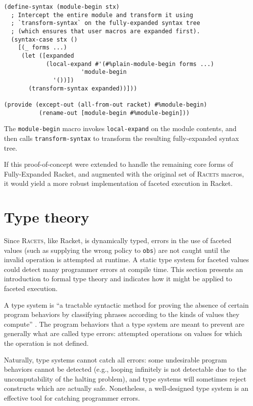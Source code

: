 \documentclass{article}
\begin{document}
\begin{lstlisting}
(define-syntax (module-begin stx)
  ; Intercept the entire module and transform it using
  ; `transform-syntax` on the fully-expanded syntax tree
  ; (which ensures that user macros are expanded first).
  (syntax-case stx ()
    [(_ forms ...)
     (let ([expanded
            (local-expand #'(#%plain-module-begin forms ...)
	                  'module-begin
			  '())])
       (transform-syntax expanded))]))

(provide (except-out (all-from-out racket) #%module-begin)
          (rename-out [module-begin #%module-begin]))
\end{lstlisting}

The \texttt{module-begin} macro invokes \texttt{local-expand} on the module contents, and then calls \texttt{transform-syntax} to transform the resulting fully-expanded syntax tree.

If this proof-of-concept were extended to handle the remaining core forms of Fully-Expanded Racket, and augmented with the original set of \textsc{Racets} macros, it would yield a more robust implementation of faceted execution in Racket.



\section{Type theory\label{sec:types}}
Since \textsc{Racets}, like Racket, is dynamically typed, errors in the use of faceted values (such as supplying the wrong policy to \texttt{obs}) are not caught until the invalid operation is attempted at runtime. A static type system for faceted values could detect many programmer errors at compile time. This section presents an introduction to formal type theory and indicates how it might be applied to faceted execution.

A type system is ``a tractable syntactic method for proving the absence of certain program behaviors by classifying phrases according to the kinds of values they compute'' \cite{types}. The program behaviors that a type system are meant to prevent are generally what are called type errors: attempted operations on values for which the operation is not defined.

Naturally, type systems cannot catch all errors: some undesirable program behaviors cannot be detected (e.g., looping infinitely is not detectable due to the uncomputability of the halting problem), and type systems will sometimes reject constructs which are actually safe. Nonetheless, a well-designed type system is an effective tool for catching programmer errors.
\end{document}

